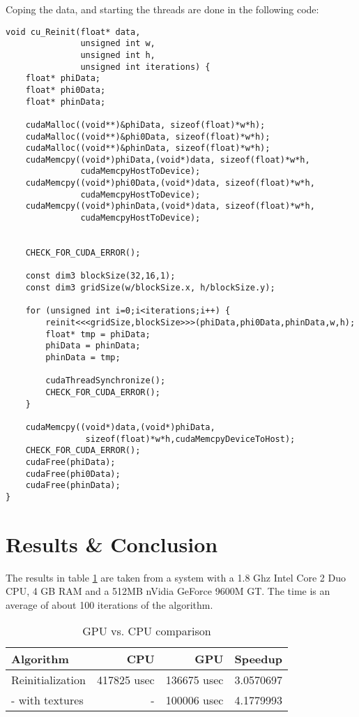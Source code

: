 Coping the data, and starting the threads are done in the following code:

\begin{lstlisting}
void cu_Reinit(float* data, 
               unsigned int w,
               unsigned int h,
               unsigned int iterations) {
    float* phiData;
    float* phi0Data;
    float* phinData;

    cudaMalloc((void**)&phiData, sizeof(float)*w*h);
    cudaMalloc((void**)&phi0Data, sizeof(float)*w*h);
    cudaMalloc((void**)&phinData, sizeof(float)*w*h);
    cudaMemcpy((void*)phiData,(void*)data, sizeof(float)*w*h,
               cudaMemcpyHostToDevice);
    cudaMemcpy((void*)phi0Data,(void*)data, sizeof(float)*w*h,
               cudaMemcpyHostToDevice);
    cudaMemcpy((void*)phinData,(void*)data, sizeof(float)*w*h,
               cudaMemcpyHostToDevice);


    CHECK_FOR_CUDA_ERROR();

    const dim3 blockSize(32,16,1);
    const dim3 gridSize(w/blockSize.x, h/blockSize.y);

    for (unsigned int i=0;i<iterations;i++) {
        reinit<<<gridSize,blockSize>>>(phiData,phi0Data,phinData,w,h);
        float* tmp = phiData;
        phiData = phinData;
        phinData = tmp;

        cudaThreadSynchronize();
        CHECK_FOR_CUDA_ERROR();
    }

    cudaMemcpy((void*)data,(void*)phiData,
                sizeof(float)*w*h,cudaMemcpyDeviceToHost);
    CHECK_FOR_CUDA_ERROR();
    cudaFree(phiData);
    cudaFree(phi0Data);
    cudaFree(phinData);
}

\end{lstlisting}

\section{Results \& Conclusion}

The results in table \ref{tbl:cudaRes} are taken from a system with a
1.8 Ghz Intel Core 2 Duo CPU, 4 GB RAM and a 512MB nVidia GeForce
9600M GT. The time is an average of about 100 iterations of the
algorithm.

\begin{table}[h]
  \centering
  \begin{tabular}{|l|r|r|r|}
    \hline    Algorithm & CPU & GPU & Speedup \\
\hline
Reinitialization & 417825 usec & 136675 usec & 3.0570697 \\
- with textures & - & 100006 usec & 4.1779993 \\
\hline
  \end{tabular}
  \caption{GPU vs. CPU comparison}
  \label{tbl:cudaRes}
\end{table}

